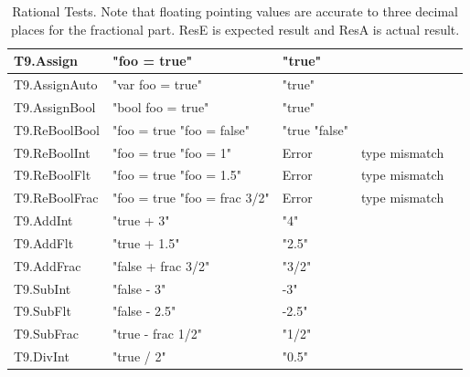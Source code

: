 \documentclass[a4paper, oneside, 11pt]{report}
\begin{document}
\begin{table}
\centering
\caption{Rational Tests. Note that floating pointing values are accurate to three decimal places for the fractional part. ResE is expected result and ResA is actual result. \\}
\label{Table2}
\begin{tabular}{|p{1.5in}|p{1.5in}|p{1.6in}|p{1.6in}|p{2.4in}|} 
\hline
T9.Assign                         & "foo = true"                            & "true"        &                \\ 
\hline
T9.AssignAuto                     & "var foo = true"                        & "true"        &                \\ 
\hline
T9.AssignBool                     & "bool foo = true"                       & "true"        &                \\ 
\hline
T9.ReBoolBool                     & "foo = true "foo = false"               & "true "false" &                \\ 
\hline
T9.ReBoolInt                      & "foo = true "foo = 1"                   & Error         & type mismatch  \\ 
\hline
T9.ReBoolFlt                      & "foo = true "foo = 1.5"                 & Error         & type mismatch  \\ 
\hline
T9.ReBoolFrac                     & "foo = true "foo = frac 3/2"            & Error         & type mismatch  \\ 
\hline
T9.AddInt                         & "true + 3"                              & "4"           &                \\ 
\hline
T9.AddFlt                         & "true + 1.5"                            & "2.5"         &                \\ 
\hline
T9.AddFrac                        & "false + frac 3/2"                      & "3/2"         &                \\ 
\hline
T9.SubInt                         & "false - 3"                             & -3"           &                \\ 
\hline
T9.SubFlt                         & "false - 2.5"                           & -2.5"         &                \\ 
\hline
T9.SubFrac                        & "true - frac 1/2"                       & "1/2"         &                \\ 
\hline
T9.DivInt                         & "true / 2"                              & "0.5"         &                \\ 

\end{tabular}
\end{table}
\end{document}
